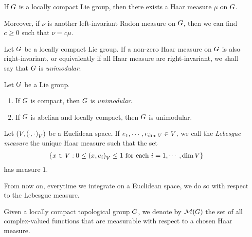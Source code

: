 \begin{proposition}
    If $G$ is a locally compact Lie group,
    then there exists a Haar measure $\mu$ on $G$.

    Moreover, if $\nu$ is another left-invariant Radon measure on $G$,
    then we can find $c \geq 0$ such that $\nu = c \mu$.
\end{proposition}

\begin{definition}
\label{definition:unimodular_group}
    Let $G$ be a locally compact Lie group.
    If a non-zero Haar measure on $G$ is also right-invariant,
    or equivalently if all Haar measure are right-invariant,
    we shall say that $G$ is \emph{unimodular}.
\end{definition}

\begin{proposition}
\label{proposition:sufficient_conditions_to_be_unimodular}
    Let $G$ be a Lie group.
    \begin{enumerate}
        \item If $G$ is compact, then $G$ is \emph{unimodular}.
        \item If $G$ is abelian and locally compact, then $G$ is unimodular.
    \end{enumerate}
\end{proposition}

\begin{definition}
\label{definition:Lebesgue_measure}
    Let $(V, {\left(\cdot, \cdot\right)_{V}})$ be a Euclidean space.
    If $e_1, \cdots, e_{\dim V} \in V$,
    we call the \emph{Lebesgue measure} the unique Haar measure such that the set
    \begin{align*}
        \{ x \in V : 0 \leq {\left(x, e_i\right)_{V}} \leq 1 \text{ for each } i = 1, \cdots, \dim V \}
    \end{align*}
    has measure $1$.
\end{definition}

From now on,
everytime we integrate on a Euclidean space,
we do so with respect to the Lebesgue measure.

Given a locally compact topological group $G$,
we denote by $\mathcal M(G)$ the set of all complex-valued functions
that are measurable with respect to a chosen Haar measure.

